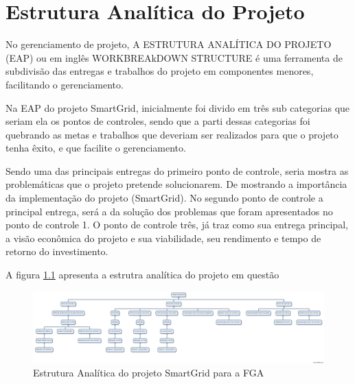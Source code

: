 \chapter[Estrutura Analítica do Projeto]{Estrutura Analítica do Projeto}

No gerenciamento de projeto, A ESTRUTURA ANALÍTICA DO PROJETO (EAP) ou em inglês WORKBREAkDOWN STRUCTURE é uma ferramenta de subdivisão das entregas e trabalhos do projeto em componentes menores, facilitando o gerenciamento.

Na EAP do projeto SmartGrid, inicialmente foi divido em três sub categorias que seriam ela os pontos de controles, sendo que a parti dessas categorias foi quebrando as metas e trabalhos que deveriam ser realizados para que o projeto tenha êxito, e que facilite o gerenciamento. 

Sendo uma das principais entregas do primeiro ponto de controle, seria mostra as problemáticas que o projeto pretende solucionarem. De mostrando a importância da implementação do projeto (SmartGrid). No segundo ponto de controle a principal entrega, será a da solução dos problemas que foram apresentados no ponto de controle 1. O ponto de controle três, já traz como sua entrega principal, a visão econômica do projeto e sua viabilidade, seu rendimento e tempo de retorno do investimento.

A figura \ref{fig:eap} apresenta a estrutra analítica do projeto em questão

\begin{figure}[!h]
	\centering
	\includegraphics[angle=270, scale=.3]{figuras/EAP.jpg}
	\caption{Estrutura Analítica do projeto SmartGrid para a FGA}
	\label{fig:eap}
\end{figure}